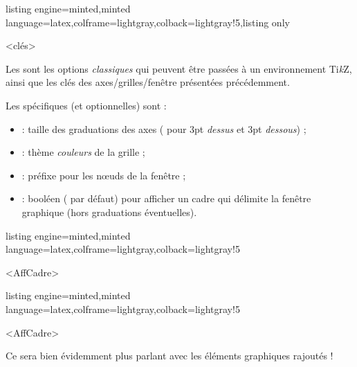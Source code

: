 \documentclass[11pt,a4paper]{ltxdoc}
\providecommand\tikzlogo{Ti\textit{k}Z}
\let\TikZ\tikzlogo
\begin{document}
\begin{tcblisting}{listing engine=minted,minted language=latex,colframe=lightgray,colback=lightgray!5,listing only}
\begin{GraphiqueTikz}<clés>
\end{GraphiqueTikz}
\end{tcblisting}

Les  sont les options \textit{classiques} qui peuvent être passées à un environnement \TikZ, ainsi que les clés des \textsf{axes/grilles/fenêtre} présentées précédemment.

\smallskip

Les  spécifiques (et optionnelles) sont :

\smallskip

\begin{itemize}
  \item {} : taille des graduations des axes (\MontreCode{3pt} pour 3pt \textit{dessus} et 3pt \textit{dessous}) ;
  \item {} : thème \textit{couleurs} de la grille ;
  \item {} : préfixe pour les nœuds de la fenêtre ;
  \item {} : booléen ( par défaut) pour afficher un cadre qui délimite la fenêtre graphique (hors graduations éventuelles).
\end{itemize}

\begin{tcblisting}{listing engine=minted,minted language=latex,colframe=lightgray,colback=lightgray!5}
\begin{GraphiqueTikz}
  [x=0.075cm,y=0.03cm,Xmin=0,Xmax=160,Xgrille=20,Xgrilles=10,
  Origy=250,Ymin=250,Ymax=400,Ygrille=25,Ygrilles=5]
  <AffCadre>
\end{GraphiqueTikz}
\end{tcblisting}

\begin{tcblisting}{listing engine=minted,minted language=latex,colframe=lightgray,colback=lightgray!5}
\begin{GraphiqueTikz}%
  [x=0.9cm,y=0.425cm,Xmin=4,Xmax=20,Origx=4,
  Ymin=40,Ymax=56,Ygrille=2,Ygrilles=1,Origy=40]
  <AffCadre>
\end{GraphiqueTikz}
\end{tcblisting}

Ce sera bien évidemment plus parlant avec les éléments graphiques rajoutés !
\end{document}
